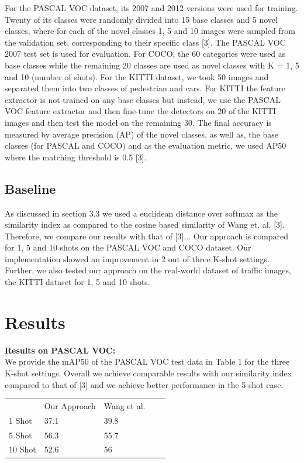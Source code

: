 \documentclass{article}
\begin{document}
For the PASCAL VOC dataset, its 2007 and 2012 versions were used for training. Twenty of its classes were randomly divided into 15 base classes and 5 novel classes, where for each of the novel classes 1,  5 and 10 images were sampled from the validation set, corresponding to their specific class [3]. The PASCAL VOC 2007 test set is used for evaluation. For COCO, the 60 categories were used as base classes while the remaining 20 classes are used as novel classes with  K = 1, 5 and 10 (number of shots). For the KITTI dataset, we took 50 images and separated them into two classes of pedestrian and cars. For KITTI the feature extractor is not trained on any base classes but instead, we use the PASCAL VOC feature extractor and then fine-tune the detectors on 20 of the KITTI images and then test the model on the remaining 30. The final accuracy is measured by average precision (AP) of the novel classes, as well as, the base classes (for PASCAL and COCO)  and as the evaluation metric, we used AP50 where the matching threshold is 0.5 [3].

\subsection{Baseline}
As discussed in section 3.3 we used a euclidean distance over softmax as the similarity index as compared to the cosine based similarity of Wang et. al. [3]. Therefore, we compare our results with that of [3]... Our approach is compared for 1, 5 and 10 shots on the PASCAL VOC and COCO dataset. Our implementation showed an improvement in 2 out of three K-shot settings. Further, we also tested our approach on the real-world dataset of traffic images, the KITTI dataset for 1, 5 and 10 shots.  

\section{Results}
\textbf{Results on PASCAL VOC:}\\
We provide the mAP50 of the PASCAL VOC test data in Table 1 for the three K-shot settings. Overall we achieve comparable results with our similarity index compared to that of [3] and we achieve better performance in the 5-shot case. 
\begin{table}[h!]
\begin{tabular}{lllll}
        & Our Approach & Wang et al. &  &  \\
1 Shot  & 37.1         & 39.8        &  &  \\
5 Shot  & 56.3         & 55.7        &  &  \\
10 Shot & 52.6         & 56          &  & 
\end{tabular}
\end{table}\\
\end{document}

